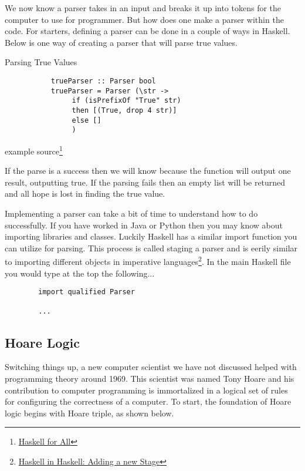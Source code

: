 \documentclass{article}
\begin{document}
        \medskip
        We now know a parser takes in an input and breaks it up into tokens for the computer to use for programmer. But how does one make a parser within the code. For starters, defining a parser can be done in a couple of ways in Haskell. Below is one way of creating a parser that will parse true values. 
        
        \medskip
        \caption{Parsing True Values}
        \begin{lstlisting}
           trueParser :: Parser bool
           trueParser = Parser (\str ->
                if (isPrefixOf "True" str)
                then [(True, drop 4 str)] 
                else []
                )
        \end{lstlisting}
        example source\footnote{\href{https://www.haskellforall.com/2012/10/parsing-chemical-substructures.html}{Haskell for All}}
        
        \medskip If the parse is a success then we will know because the function will output one result, outputting true. If the parsing fails then an empty list will be returned and all hope is lost in finding the true value. 
        
        \medskip Implementing a parser can take a bit of time to understand how to do successfully. If you have worked in Java or Python then you may know about importing libraries and classes. Luckily Haskell has a similar import function you can utilize for parsing. This process is called staging a parser and is eerily similar to importing different objects in imperative languages\footnote{\href{https://cronokirby.com/posts/2020/12/haskell-in-haskell-3/}{Haskell in Haskell: Adding a new Stage}}. In the main Haskell file you would type at the top the following...
        
        \begin{lstlisting}
        import qualified Parser
        
        ...
        \end{lstlisting}
        
        
\subsection{Hoare Logic}
Switching things up, a new computer scientist we have not discussed helped with programming theory around 1969. This scientist was named Tony Hoare and his contribution to computer programming is immortalized in a logical set of rules for configuring the correctness of a computer. To start, the foundation of Hoare logic begins with Hoare triple, as shown below.
\end{document}
